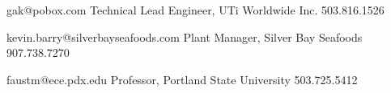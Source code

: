 {gak@pobox.com}
{Technical Lead Engineer, UTi Worldwide Inc.}
{503.816.1526}

{kevin.barry@silverbayseafoods.com}
{Plant Manager, Silver Bay Seafoods}
{907.738.7270}

{faustm@ece.pdx.edu}
{Professor, Portland State University}
{503.725.5412}
